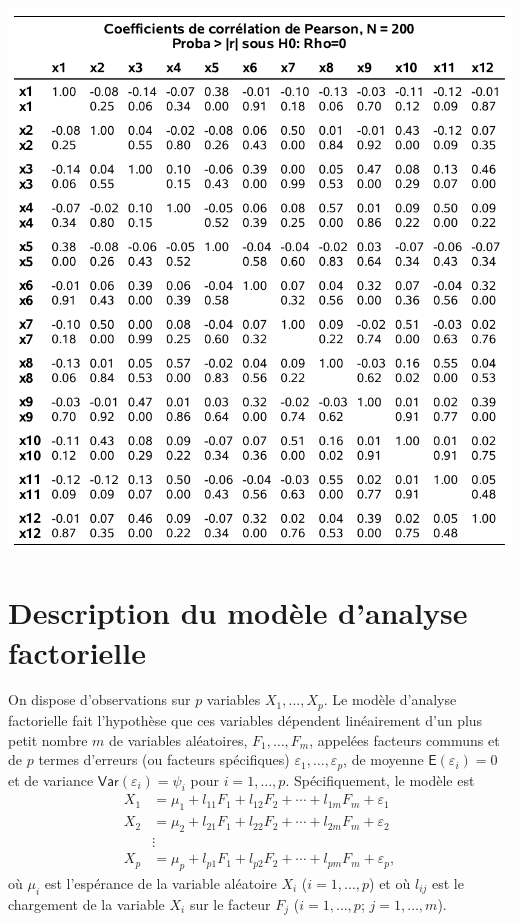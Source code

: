 \documentclass[
  11pt,
  letterpaper,
]{book}
\theoremstyle{definition}
\theoremstyle{definition}
\theoremstyle{definition}
\theoremstyle{remark}
\begin{document}
\begin{center}\includegraphics[width=0.9\linewidth]{figures/01-facto-e2} \end{center}

\hypertarget{description-du-moduxe8le-danalyse-factorielle}{%
\section{Description du modèle d'analyse factorielle}\label{description-du-moduxe8le-danalyse-factorielle}}

On dispose d'observations sur \(p\) variables \(X_1, \ldots, X_p\). Le modèle d'analyse factorielle fait l'hypothèse que ces variables dépendent linéairement d'un plus petit nombre \(m\) de variables aléatoires, \(F_1, \ldots, F_m\), appelées facteurs communs et de \(p\) termes d'erreurs (ou facteurs spécifiques) \(\varepsilon_1, \ldots, \varepsilon_p\), de moyenne \({\mathsf E}\left(\varepsilon_i\right)=0\) et de variance \({\mathsf{Var}}\left(\varepsilon_i\right)=\psi_i\) pour \(i=1, \ldots, p\). Spécifiquement, le modèle est
\begin{align*}
X_1 &= \mu_1 + l_{11}F_1 + l_{12} F_2 + \cdots + l_{1m}F_m + \varepsilon_1\\
X_2 &= \mu_2 + l_{21}F_1 + l_{22} F_2 + \cdots + l_{2m}F_m + \varepsilon_2\\
&\vdots \\
X_p &= \mu_p + l_{p1}F_1 + l_{p2} F_2 + \cdots + l_{pm}F_m + \varepsilon_p, 
\end{align*}
où \(\mu_i\) est l'espérance de la variable aléatoire \(X_i\) (\(i=1, \ldots, p\)) et où \(l_{ij}\) est le chargement de la variable \(X_i\) sur le facteur \(F_j\) (\(i=1, \ldots, p\); \(j=1, \ldots, m\)).
\end{document}
